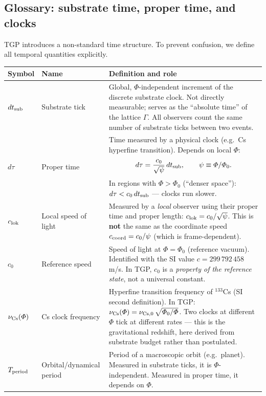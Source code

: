 
\subsection{Glossary: substrate time, proper time, and clocks}%
\label{ssec:time-glossary}

TGP introduces a non-standard time structure.  To prevent confusion,
we define all temporal quantities explicitly.

\begin{center}\small
\begin{tabular}{@{}lp{4.5cm}p{6.5cm}@{}}
\toprule
\textbf{Symbol} & \textbf{Name} & \textbf{Definition and role} \\
\midrule
$dt_{\rm sub}$
  & Substrate tick
  & Global, $\Phi$-independent increment of the discrete substrate clock.
    Not directly measurable; serves as the ``absolute time'' of the lattice
    $\Gamma$.  All observers count the same number of substrate ticks
    between two events. \\[6pt]
$d\tau$
  & Proper time
  & Time measured by a physical clock (e.g.\ Cs hyperfine transition).
    Depends on local $\Phi$:
    \begin{equation*}
      d\tau = \frac{c_0}{\sqrt{\psi}}\,dt_{\rm sub},
      \qquad \psi \equiv \Phi/\Phi_0.
    \end{equation*}
    In regions with $\Phi > \Phi_0$ (``denser space''): $d\tau < c_0\,dt_{\rm sub}$
    --- clocks run slower. \\[6pt]
$c_{\rm lok}$
  & Local speed of light
  & Measured by a \emph{local} observer using their proper time and
    proper length:
    $c_{\rm lok} = c_0/\sqrt{\psi}$.
    This is \textbf{not} the same as the coordinate speed
    $c_{\rm coord} = c_0/\psi$ (which is frame-dependent). \\[6pt]
$c_0$
  & Reference speed
  & Speed of light at $\Phi = \Phi_0$ (reference vacuum).
    Identified with the SI value $c = 299\,792\,458$\,m/s.
    In TGP, $c_0$ is a \emph{property of the reference state},
    not a universal constant. \\[6pt]
$\nu_{\rm Cs}(\Phi)$
  & Cs clock frequency
  & Hyperfine transition frequency of $^{133}$Cs (SI second definition).
    In TGP: $\nu_{\rm Cs}(\Phi) = \nu_{\rm Cs,0}\,\sqrt{\Phi_0/\Phi}$.
    Two clocks at different $\Phi$ tick at different rates
    --- this is the gravitational redshift, here derived from substrate
    budget rather than postulated. \\[6pt]
$T_{\rm period}$
  & Orbital/dynamical period
  & Period of a macroscopic orbit (e.g.\ planet).
    Measured in substrate ticks, it is $\Phi$-independent.
    Measured in proper time, it depends on $\Phi$. \\
\bottomrule
\end{tabular}
\end{center}

